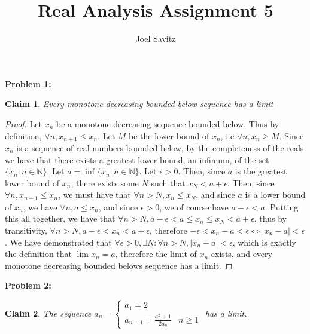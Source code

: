 \documentclass{article}
\title{Real Analysis Assignment 5}
\author{Joel Savitz}
\newcommand{\nats}{\ensuremath{\mathbb{N}}}
\newcommand{\eps}{\ensuremath{\epsilon}}
\newtheorem{clm}{Claim}
\begin{document}
\maketitle

\textbf{Problem 1:}

\begin{clm}
	Every monotone decreasing bounded below sequence has a limit
\end{clm}

\begin{proof}
	Let $x_n$ be a monotone decreasing sequence bounded below.
	Thus by definition, $\forall n, x_{n+1} \le x_n$.
	Let $M$ be the lower bound of $x_n$, i.e $\forall n, x_n \geq M$.
	Since $x_n$ is a sequence of real numbers bounded below,
	by the completeness of the reals we have that there exists
	a greatest lower bound, an infimum, of the set $\{ x_n : n \in \nats \}$.
	Let $a = \inf\{x_n : n \in \nats \}$.
	Let $\eps > 0$.
	Then, since $a$ is the greatest lower bound of $x_n$,
	there exists some $N$ such that $x_N < a + \eps$.
	Then, since $\forall n, x_{n+1} \le x_n$,
	we must have that $\forall n > N, x_n \le x_N$,
	and since $a$ is a lower bound of $x_n$,
	we have $\forall n, a \le x_n$, and since $\eps > 0$,
	we of course have $a - \eps < a$.
	Putting this all together,
	we have that $\forall n > N, a - \eps < a \le x_n \le x_N < a + \eps$,
	thus by transitivity, $\forall n > N, a - \eps < x_n < a + \eps$,
	therefore $-\eps < x_n - a < \eps \iff | x_n - a | < \eps$.
	We have demonstrated that
	$\forall \eps > 0, \exists N: \forall n > N, | x_n - a | < \eps$,
	which is exactly the definition that $\lim x_n = a$,
	therefore the limit of $x_n$ exists,
	and every monotone decreasing bounded belows sequence has a limit.
\end{proof}

\textbf{Problem 2:}


\begin{clm}
	The sequence $a_n = \begin{cases} a_1 = 2 \\ a_{n+1} = \frac{a_n^2 + 1}{2a_n} & n \geq 1 \end{cases}$ has a limit.
\end{clm}
\end{document}
